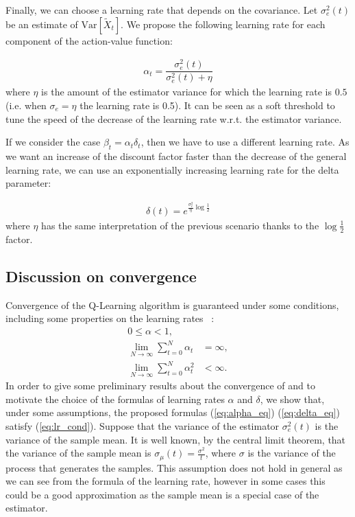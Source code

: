 \documentclass[conference]{IEEEtran}
\begin{document}
Finally, we can choose a learning rate that depends on the covariance. Let $\sigma_e^2(t)$ be an estimate of $\mathrm{Var}\left[\widetilde{X}_{t}\right]$. We propose the following learning rate for each component of the action-value function:

\begin{align}\label{eq:alpha_eq}
 \alpha_t=\dfrac{\sigma_e^2(t)}{\sigma_e^2(t)+\eta}
\end{align}
where $\eta$ is the amount of the estimator variance for which the learning rate is $0.5$ (i.e. when $\sigma_e=\eta$ the learning rate is 0.5). It can be seen as a soft threshold to tune the speed of the decrease of the learning rate w.r.t. the estimator variance.

If we consider the case $\beta_t=\alpha_t\delta_t$, then we have to use a different learning rate. As we want an increase of the discount factor faster than the decrease of the general learning rate, we can use an exponentially increasing learning rate for the delta parameter:

\begin{align}\label{eq:delta_eq}
 \delta(t) = e^{\frac{\sigma_e^2}{\eta}\log\frac{1}{2}}
\end{align}
where $\eta$ has the same interpretation of the previous scenario thanks to the $\log\frac{1}{2}$ factor.

\subsection{Discussion on convergence}
Convergence of the Q-Learning algorithm is guaranteed under some conditions, including some properties on the learning rates ~\cite{EvenDar2001, watkins1992q}:
\begin{align}
 0 \leq \alpha < 1,\nonumber \\
 \lim_{N\rightarrow\infty} \sum_{t=0}^{N}\alpha_t & = \infty,\nonumber \\
 \lim_{N\rightarrow\infty} \sum_{t=0}^{N}\alpha_t^2 & < \infty. \label{eq:lr_cond}
\end{align}
In order to give some preliminary results about the convergence of \alg and to motivate the choice of the formulas of learning rates $\alpha$ and $\delta$, we show that, under some assumptions, the proposed formulas (\ref{eq:alpha_eq}) (\ref{eq:delta_eq}) satisfy (\ref{eq:lr_cond}). Suppose that the variance of the estimator $\sigma_e^2(t)$ is the variance of the sample mean. It is well known, by the central limit theorem, that the variance of the sample mean is $\sigma_{\mu}(t)=\frac{\sigma^2}{t}$, where $\sigma$ is the variance of the process that generates the samples.
This assumption does not hold in general as we can see from the formula of the learning rate, however in some cases this could be a good approximation as the sample mean is a special case of the estimator.
\end{document}
